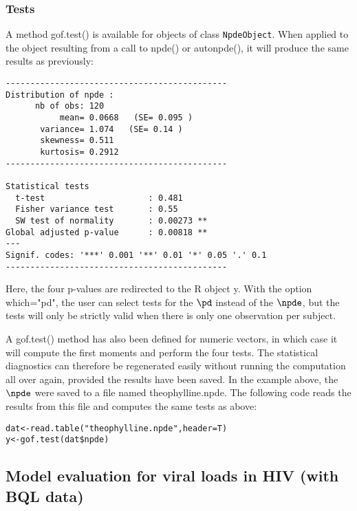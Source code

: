 \subsubsection{Tests}

\hskip 18pt A method {\sf gof.test()} is available for objects of class \texttt{NpdeObject}. When applied to the object resulting from a call to {\sf npde()} or {\sf autonpde()}, it will produce the same results as previously:
\begin{verbatim}
---------------------------------------------
Distribution of npde :
      nb of obs: 120 
           mean= 0.0668   (SE= 0.095 )
       variance= 1.074   (SE= 0.14 )
       skewness= 0.511 
       kurtosis= 0.2912 
---------------------------------------------

Statistical tests
  t-test                     : 0.481
  Fisher variance test       : 0.55
  SW test of normality       : 0.00273 **
Global adjusted p-value      : 0.00818 **
---
Signif. codes: '***' 0.001 '**' 0.01 '*' 0.05 '.' 0.1 
---------------------------------------------
\end{verbatim}
Here, the four p-values are redirected to the R object {\sf y}. With the option {\sf which="pd"}, the user can select tests for the $\pd$ instead of the $\npde$, but the tests will only be strictly valid when there is only one observation per subject.

A {\sf gof.test()} method has also been defined for numeric vectors, in which case it will compute the first moments and perform the four tests. The statistical diagnostics can therefore be regenerated easily without running the computation all over again, provided the results have been saved. In the example above, the $\npde$ were saved to a file named {\sf theophylline.npde}. The following code reads the results from this file and computes the same tests as above:
\begin{verbatim}
dat<-read.table("theophylline.npde",header=T)
y<-gof.test(dat$npde) 
\end{verbatim}


\clearpage

\subsection{Model evaluation for viral loads in HIV (with BQL data)} \label{sec:PDexample}

